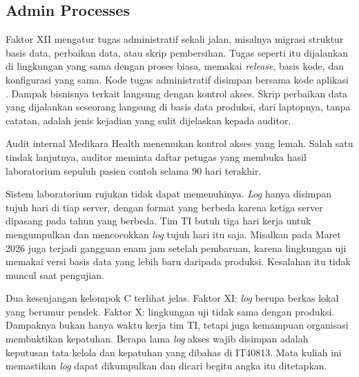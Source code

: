 \subsection{Admin Processes}

Faktor XII mengatur tugas administratif sekali jalan, misalnya migrasi struktur basis data,
perbaikan data, atau skrip pembersihan. Tugas seperti itu dijalankan di lingkungan yang sama
dengan proses biasa, memakai \textit{release}, basis kode, dan konfigurasi yang sama. Kode
tugas administratif disimpan bersama kode aplikasi \cite{twelvefactor}. Dampak bisnisnya
terkait langsung dengan kontrol akses. Skrip perbaikan data yang dijalankan seseorang
langsung di basis data produksi, dari laptopnya, tanpa catatan, adalah jenis kejadian yang
sulit dijelaskan kepada auditor.

\begin{kasus}[title={Kasus Medikara Health: Pertanyaan Audit tentang Hasil Laboratorium}]
  Audit internal Medikara Health menemukan kontrol akses yang lemah. Salah satu tindak
  lanjutnya, auditor meminta daftar petugas yang membuka hasil laboratorium sepuluh pasien
  contoh selama 90 hari terakhir.

  Sistem laboratorium rujukan tidak dapat memenuhinya. \textit{Log} hanya disimpan tujuh
  hari di tiap server, dengan format yang berbeda karena ketiga server dipasang pada tahun
  yang berbeda. Tim TI butuh tiga hari kerja untuk mengumpulkan dan mencocokkan \textit{log}
  tujuh hari itu saja. Misalkan pada Maret 2026 juga terjadi gangguan enam jam setelah
  pembaruan, karena lingkungan uji memakai versi basis data yang lebih baru daripada
  produksi. Kesalahan itu tidak muncul saat pengujian.

  Dua kesenjangan kelompok C terlihat jelas. Faktor XI: \textit{log} berupa berkas lokal
  yang berumur pendek. Faktor X: lingkungan uji tidak sama dengan produksi. Dampaknya bukan
  hanya waktu kerja tim TI, tetapi juga kemampuan organisasi membuktikan kepatuhan. Berapa
  lama \textit{log} akses wajib disimpan adalah keputusan tata kelola dan kepatuhan yang
  dibahas di IT40813. Mata kuliah ini memastikan \textit{log} dapat dikumpulkan dan dicari
  begitu angka itu ditetapkan.
\end{kasus}

